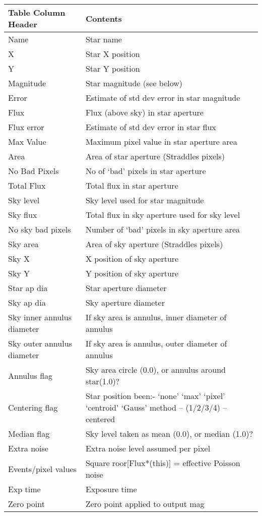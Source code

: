 {{\begin{tabular}{|l|p{3in}|}\hline                                               
   Table Column Header & Contents \\ \hline
   Name               &	Star name \\
   X 			& Star X position \\
   Y			& Star Y position \\
   Magnitude		& Star magnitude (see below) \\
   Error		& Estimate of std dev error in star magnitude \\
   Flux			& Flux (above sky) in star aperture \\
   Flux error		& Estimate of std dev error in star flux \\
   Max Value 		& Maximum pixel value in star aperture area \\
   Area 		& Area of star aperture (Straddles pixels) \\
   No Bad Pixels 	& No of `bad' pixels in star aperture \\
   Total Flux		& Total flux in star aperture \\
   Sky level 		& Sky level used for star magnitude \\
   Sky flux 		& Total flux in sky aperture used for sky level \\
   No sky bad pixels	& Number of `bad' pixels in sky aperture area \\
   Sky area 		& Area of sky aperture (Straddles pixels) \\
   Sky X 		& X position of sky aperture \\
   Sky Y  		& Y position of sky aperture \\
   Star ap dia 		& Star aperture diameter \\
   Sky ap dia 		& Sky aperture diameter \\
   Sky inner annulus diameter   & If sky area is annulus, inner diameter of annulus \\
   Sky outer annulus diameter  &  If sky area is annulus, outer diameter of annulus \\
   Annulus flag 	& Sky area circle (0.0), or annulus around star(1.0)? \\
   Centering flag 	& Star position been:- `none' `max' `pixel' 
                          `centroid' `Gauss' method -- (1/2/3/4) -- centered \\
   Median flag 		& Sky level taken as mean (0.0), or median (1.0)? \\
   Extra noise 		& Extra noise level assumed per pixel \\
   Events/pixel values 	& Square roor[Flux*(this)] = effective Poisson noise \\
   Exp time 		& Exposure time \\
   Zero point		& Zero point applied to output mag \\ \hline
\end{tabular}
                                                                               
}}
